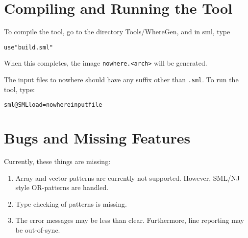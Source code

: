 \documentclass{article}
\newcommand{\nowhere}{{\sf nowhere}}
\begin{document}
\section{Compiling and Running the Tool}

To compile the tool, go to the directory Tools/WhereGen, and in sml, type
\begin{alltt}
   use "build.sml"
\end{alltt}
When this completes, the image \verb|nowhere.<arch>| will be generated.

The input files to \nowhere{} should have any suffix other than \verb|.sml|.
To run the tool, type:
\begin{alltt}
    sml @SMLload=nowhere inputfile
\end{alltt}

\section{Bugs and Missing Features}
   Currently, these things are missing:
\begin{enumerate}
  \item  Array and vector patterns are currently not supported. 
        However, SML/NJ style OR-patterns are handled.
  \item Type checking of patterns is missing.
  \item The error messages may be less than clear.  Furthermore, 
        line reporting may be out-of-sync.
\end{enumerate}
\end{document}
